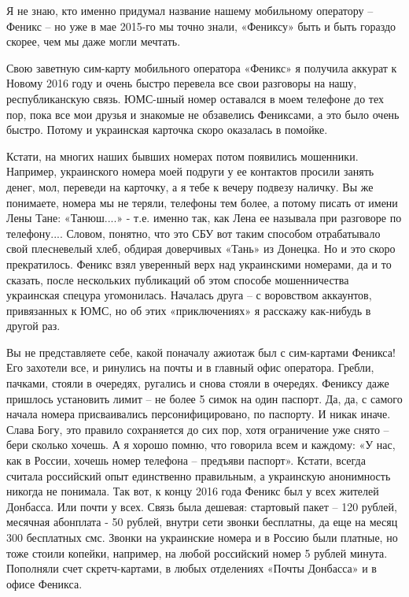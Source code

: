 Я не знаю, кто именно придумал название нашему мобильному оператору – Феникс –
но уже в мае 2015-го мы точно знали, «Фениксу» быть и быть гораздо скорее, чем
мы даже могли мечтать.

Свою заветную сим-карту мобильного оператора «Феникс» я получила аккурат к
Новому 2016 году и очень быстро перевела все свои разговоры на нашу,
республиканскую связь. ЮМС-шный номер оставался в моем телефоне до тех пор,
пока все мои друзья и знакомые не обзавелись Фениксами, а это было очень
быстро. Потому и украинская карточка скоро оказалась в помойке.

Кстати, на многих наших бывших номерах потом появились мошенники. Например,
украинского номера моей подруги у ее контактов просили занять денег, мол,
переведи на карточку, а я тебе к вечеру подвезу наличку. Вы же понимаете,
номера мы не теряли, телефоны тем более, а потому писать от имени Лены Тане:
«Танюш....» - т.е. именно так, как Лена ее называла при разговоре по телефону....
Словом, понятно, что это СБУ вот таким способом отрабатывало свой плесневелый
хлеб, обдирая доверчивых «Тань» из Донецка. Но и это скоро прекратилось. Феникс
взял уверенный верх над украинскими номерами, да и то сказать, после нескольких
публикаций об этом способе мошенничества украинская спецура угомонилась.
Началась друга – с воровством аккаунтов, привязанных к ЮМС, но об этих
«приключениях» я расскажу как-нибудь в другой раз.


Вы не представляете себе, какой поначалу ажиотаж был с сим-картами Феникса! Его
захотели все, и ринулись на почты и в главный офис оператора. Гребли, пачками,
стояли в очередях, ругались и снова стояли в очередях. Фениксу даже пришлось
установить лимит – не более 5 симок на один паспорт. Да, да, с самого начала
номера присваивались персонифицировано, по паспорту. И никак иначе. Слава Богу,
это правило сохраняется до сих пор, хотя ограничение уже снято – бери сколько
хочешь. А я хорошо помню, что говорила всем и каждому: «У нас, как в России,
хочешь номер телефона – предъяви паспорт». Кстати, всегда считала российский
опыт единственно правильным, а украинскую анонимность никогда не понимала. Так
вот, к концу 2016 года Феникс был у всех жителей Донбасса. Или почти у всех.
Связь была дешевая: стартовый пакет – 120 рублей, месячная абонплата - 50
рублей, внутри сети звонки бесплатны, да еще на месяц 300 бесплатных смс.
Звонки на украинские номера и в Россию были платные, но тоже стоили копейки,
например, на любой российский номер 5 рублей минута. Пополняли счет
скретч-картами, в любых отделениях «Почты Донбасса» и в офисе Феникса.

